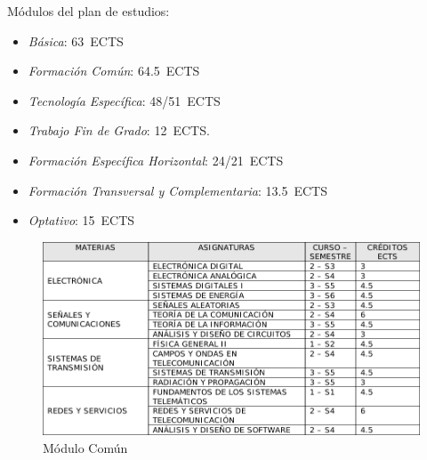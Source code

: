 \documentclass[xcolor=table,xcolor=x11names]{beamer}
\begin{document}
\begin{frame}{\subsecname}

Módulos del plan de estudios:
\begin{itemize}
    \item \emph{Básica}:
        63~ECTS 
    \item \emph{Formación Común}: 64.5~ECTS
    \item \emph{Tecnología Específica}:
        48/51~ECTS
    \item \emph{Trabajo Fin de Grado}: 12~ECTS.
    \item \emph{Formación Específica Horizontal}:
        24/21~ECTS 
    \item \emph{Formación Transversal y Complementaria}:
        13.5~ECTS 
    \item \emph{Optativo}: 15~ECTS
\end{itemize}

        

\begin{figure}[t]
    \centering
    \includegraphics[width=.6\textwidth]{figures/gitst-modulo-comun}
\caption{Módulo Común}%
    \label{fig:gitst-modulo-comun}
\end{figure}

\end{frame}
\end{document}
